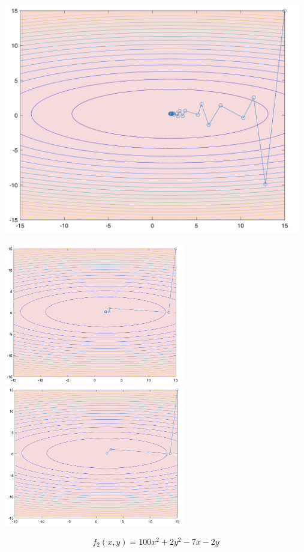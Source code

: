 \documentclass[a4paper,12pt]{article}
\begin{document}
\begin{center}
    \includegraphics[width=130mm]{p11.png}

    \includegraphics[width=80mm]{p21.png}\includegraphics[width=80mm]{p31.png}
\end{center}

\clearpage

\begin{equation*}
    f_2(x, y) = 100x^2 + 2y^2 - 7x - 2y
\end{equation*}
\end{document}
